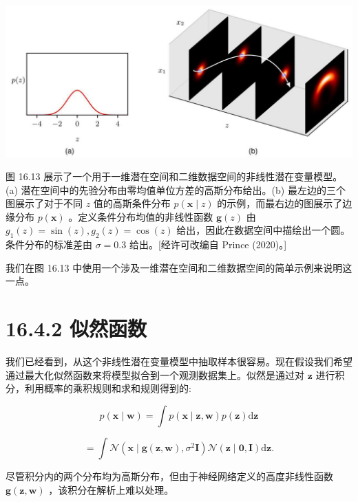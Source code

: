 \documentclass[10pt]{report}
\begin{document}
\begin{center}
\includegraphics[max width=1.0\textwidth]{images/0194e279-9b28-703a-88f4-c3ac21e2010d_543_226_367_1266_555_0.jpg}
\end{center}
\hspace*{3em} 

图 16.13 展示了一个用于一维潜在空间和二维数据空间的非线性潜在变量模型。(a) 潜在空间中的先验分布由零均值单位方差的高斯分布给出。(b) 最左边的三个图展示了对于不同 \(z\) 值的高斯条件分布 \(p\left( {\mathbf{x} \mid  z}\right)\) 的示例，而最右边的图展示了边缘分布 \(p\left( \mathbf{x}\right)\) 。定义条件分布均值的非线性函数 \(\mathbf{g}\left( z\right)\) 由 \({g}_{1}\left( z\right)  = \sin \left( z\right) ,{g}_{2}\left( z\right)  = \cos \left( z\right)\) 给出，因此在数据空间中描绘出一个圆。条件分布的标准差由 \(\sigma  = {0.3}\) 给出。[经许可改编自 Prince (2020)。]

我们在图 16.13 中使用一个涉及一维潜在空间和二维数据空间的简单示例来说明这一点。

\section*{16.4.2 似然函数}

我们已经看到，从这个非线性潜在变量模型中抽取样本很容易。现在假设我们希望通过最大化似然函数来将模型拟合到一个观测数据集上。似然是通过对 \(\mathbf{z}\) 进行积分，利用概率的乘积规则和求和规则得到的:

\[
p\left( {\mathbf{x} \mid  \mathbf{w}}\right)  = \int p\left( {\mathbf{x} \mid  \mathbf{z},\mathbf{w}}\right) p\left( \mathbf{z}\right) \mathrm{d}\mathbf{z}
\]

\[
= \int \mathcal{N}\left( {\mathbf{x} \mid  \mathbf{g}\left( {\mathbf{z},\mathbf{w}}\right) ,{\sigma }^{2}\mathbf{I}}\right) \mathcal{N}\left( {\mathbf{z} \mid  \mathbf{0},\mathbf{I}}\right) \mathrm{d}\mathbf{z}. \tag{16.82}
\]

尽管积分内的两个分布均为高斯分布，但由于神经网络定义的高度非线性函数 \(\mathbf{g}\left( {\mathbf{z},\mathbf{w}}\right)\) ，该积分在解析上难以处理。
\end{document}
